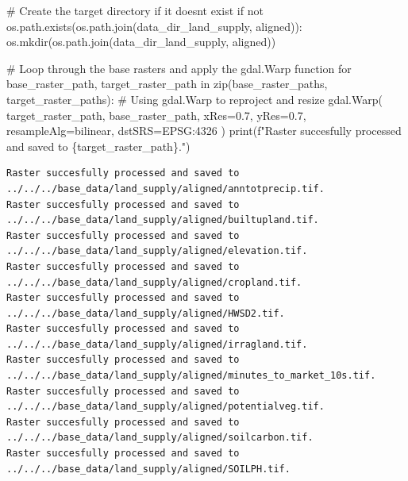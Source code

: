 \documentclass[
  letterpaper,
]{article}
\newenvironment{Shaded}{\begin{snugshade}}{\end{snugshade}}
\newcommand{\BuiltInTok}[1]{\textcolor[rgb]{0.00,0.23,0.31}{#1}}
\newcommand{\CommentTok}[1]{\textcolor[rgb]{0.37,0.37,0.37}{#1}}
\newcommand{\ControlFlowTok}[1]{\textcolor[rgb]{0.00,0.23,0.31}{#1}}
\newcommand{\FloatTok}[1]{\textcolor[rgb]{0.68,0.00,0.00}{#1}}
\newcommand{\KeywordTok}[1]{\textcolor[rgb]{0.00,0.23,0.31}{#1}}
\newcommand{\NormalTok}[1]{\textcolor[rgb]{0.00,0.23,0.31}{#1}}
\newcommand{\OperatorTok}[1]{\textcolor[rgb]{0.37,0.37,0.37}{#1}}
\newcommand{\SpecialCharTok}[1]{\textcolor[rgb]{0.37,0.37,0.37}{#1}}
\newcommand{\SpecialStringTok}[1]{\textcolor[rgb]{0.13,0.47,0.30}{#1}}
\newcommand{\StringTok}[1]{\textcolor[rgb]{0.13,0.47,0.30}{#1}}
\begin{document}
\begin{Shaded}
\begin{Highlighting}[]
\CommentTok{\# Create the target directory if it doesn\textquotesingle{}t exist}
\ControlFlowTok{if} \KeywordTok{not}\NormalTok{ os.path.exists(os.path.join(data\_dir\_land\_supply, }\StringTok{\textquotesingle{}aligned\textquotesingle{}}\NormalTok{)):}
\NormalTok{    os.mkdir(os.path.join(data\_dir\_land\_supply, }\StringTok{\textquotesingle{}aligned\textquotesingle{}}\NormalTok{))}

\CommentTok{\# Loop through the base rasters and apply the gdal.Warp function}
\ControlFlowTok{for}\NormalTok{ base\_raster\_path, target\_raster\_path }\KeywordTok{in} \BuiltInTok{zip}\NormalTok{(base\_raster\_paths, target\_raster\_paths):     }
    \CommentTok{\# Using gdal.Warp to reproject and resize}
\NormalTok{    gdal.Warp(}
\NormalTok{        target\_raster\_path,}
\NormalTok{        base\_raster\_path,}
\NormalTok{        xRes}\OperatorTok{=}\FloatTok{0.7}\NormalTok{,}
\NormalTok{        yRes}\OperatorTok{=}\FloatTok{0.7}\NormalTok{,}
\NormalTok{        resampleAlg}\OperatorTok{=}\StringTok{\textquotesingle{}bilinear\textquotesingle{}}\NormalTok{,         }
\NormalTok{        dstSRS}\OperatorTok{=}\StringTok{\textquotesingle{}EPSG:4326\textquotesingle{}}  
\NormalTok{    )}
    \BuiltInTok{print}\NormalTok{(}\SpecialStringTok{f"Raster succesfully processed and saved to }\SpecialCharTok{\{}\NormalTok{target\_raster\_path}\SpecialCharTok{\}}\SpecialStringTok{."}\NormalTok{)}
\end{Highlighting}
\end{Shaded}

\begin{verbatim}
Raster succesfully processed and saved to ../../../base_data/land_supply/aligned/anntotprecip.tif.
Raster succesfully processed and saved to ../../../base_data/land_supply/aligned/builtupland.tif.
Raster succesfully processed and saved to ../../../base_data/land_supply/aligned/elevation.tif.
Raster succesfully processed and saved to ../../../base_data/land_supply/aligned/cropland.tif.
Raster succesfully processed and saved to ../../../base_data/land_supply/aligned/HWSD2.tif.
Raster succesfully processed and saved to ../../../base_data/land_supply/aligned/irragland.tif.
Raster succesfully processed and saved to ../../../base_data/land_supply/aligned/minutes_to_market_10s.tif.
Raster succesfully processed and saved to ../../../base_data/land_supply/aligned/potentialveg.tif.
Raster succesfully processed and saved to ../../../base_data/land_supply/aligned/soilcarbon.tif.
Raster succesfully processed and saved to ../../../base_data/land_supply/aligned/SOILPH.tif.
\end{verbatim}
\end{document}
